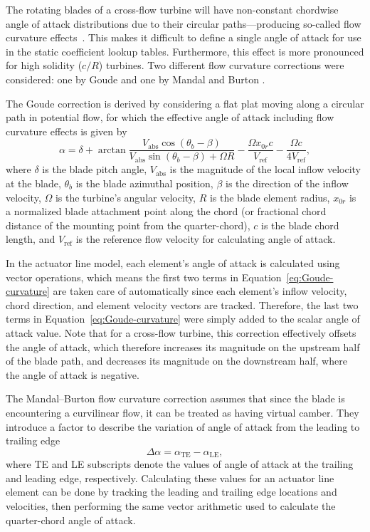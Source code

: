 The rotating blades of a cross-flow turbine will have non-constant chordwise
angle of attack distributions due to their circular paths---producing so-called
flow curvature effects~\cite{Migliore1980}. This makes it difficult to define a
single angle of attack for use in the static coefficient lookup tables.
Furthermore, this effect is more pronounced for high solidity ($c/R$) turbines.
Two different flow curvature corrections were considered: one by Goude
\cite{Goude2012} and one by Mandal and Burton \cite{Mandal1994}.

The Goude correction is derived by considering a flat plat moving along a
circular path in potential flow, for which the effective angle of attack
including flow curvature effects is given by
\begin{equation}
    \alpha = \delta + \arctan \frac{V_\mathrm{abs} \cos(\theta_b -
        \beta)}{V_\mathrm{abs} \sin(\theta_b - \beta) + \Omega R} - \frac{\Omega
        x_{0r}c}{V_\mathrm{ref}} - \frac{\Omega c}{4 V_\mathrm{ref}},
    \label{eq:Goude-curvature}
\end{equation}
where $\delta$ is the blade pitch angle, $V_\mathrm{abs}$ is the magnitude of
the local inflow velocity at the blade, $\theta_b$ is the blade azimuthal
position, $\beta$ is the direction of the inflow velocity, $\Omega$ is the
turbine's angular velocity, $R$ is the blade element radius, $x_{0r}$ is a
normalized blade attachment point along the chord (or fractional chord distance
of the mounting point from the quarter-chord), $c$ is the blade chord length,
and $V_\mathrm{ref}$ is the reference flow velocity for calculating angle of
attack.

In the actuator line model, each element's angle of attack is calculated using
vector operations, which means the first two terms in
Equation~\ref{eq:Goude-curvature} are taken care of automatically since each
element's inflow velocity, chord direction, and element velocity vectors are
tracked. Therefore, the last two terms in Equation~\ref{eq:Goude-curvature} were
simply added to the scalar angle of attack value. Note that for a cross-flow
turbine, this correction effectively offsets the angle of attack, which
therefore increases its magnitude on the upstream half of the blade path, and
decreases its magnitude on the downstream half, where the angle of attack is
negative.

The Mandal--Burton flow curvature correction assumes that since the blade is
encountering a curvilinear flow, it can be treated as having virtual camber.
They introduce a factor to describe the variation of angle of attack from the
leading to trailing edge
\begin{equation}
    \Delta \alpha = \alpha_\mathrm{TE} - \alpha_\mathrm{LE},
    \label{eq:Mandal-Burton-alpha-diff}
\end{equation}
where TE and LE subscripts denote the values of angle of attack at the trailing
and leading edge, respectively. Calculating these values for an actuator line
element can be done by tracking the leading and trailing edge locations and
velocities, then performing the same vector arithmetic used to calculate the
quarter-chord angle of attack.


